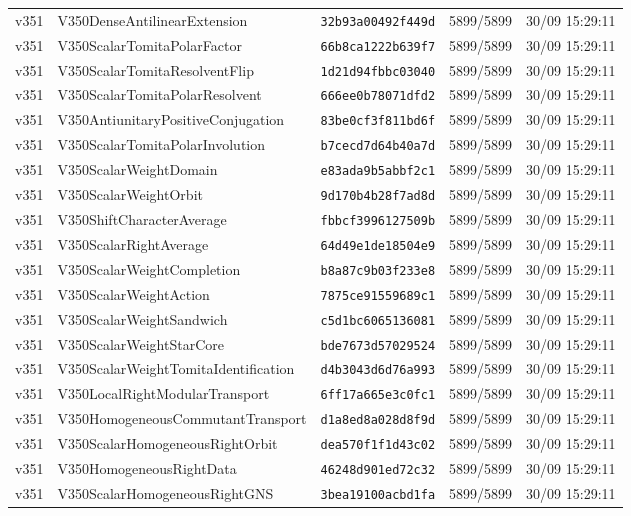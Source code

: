 \documentclass[11pt]{article}
\theoremstyle{definition}\newtheorem{deriv}{Derivation}
\begin{document}
{\begin{longtable}{@{}lllll@{}}
v351 & V350DenseAntilinearExtension & \texttt{32b93a00492f449d} & 5899/5899 & 30/09 15:29:11 \\
v351 & V350ScalarTomitaPolarFactor & \texttt{66b8ca1222b639f7} & 5899/5899 & 30/09 15:29:11 \\
v351 & V350ScalarTomitaResolventFlip & \texttt{1d21d94fbbc03040} & 5899/5899 & 30/09 15:29:11 \\
v351 & V350ScalarTomitaPolarResolvent & \texttt{666ee0b78071dfd2} & 5899/5899 & 30/09 15:29:11 \\
v351 & V350AntiunitaryPositiveConjugation & \texttt{83be0cf3f811bd6f} & 5899/5899 & 30/09 15:29:11 \\
v351 & V350ScalarTomitaPolarInvolution & \texttt{b7cecd7d64b40a7d} & 5899/5899 & 30/09 15:29:11 \\
v351 & V350ScalarWeightDomain & \texttt{e83ada9b5abbf2c1} & 5899/5899 & 30/09 15:29:11 \\
v351 & V350ScalarWeightOrbit & \texttt{9d170b4b28f7ad8d} & 5899/5899 & 30/09 15:29:11 \\
v351 & V350ShiftCharacterAverage & \texttt{fbbcf3996127509b} & 5899/5899 & 30/09 15:29:11 \\
v351 & V350ScalarRightAverage & \texttt{64d49e1de18504e9} & 5899/5899 & 30/09 15:29:11 \\
v351 & V350ScalarWeightCompletion & \texttt{b8a87c9b03f233e8} & 5899/5899 & 30/09 15:29:11 \\
v351 & V350ScalarWeightAction & \texttt{7875ce91559689c1} & 5899/5899 & 30/09 15:29:11 \\
v351 & V350ScalarWeightSandwich & \texttt{c5d1bc6065136081} & 5899/5899 & 30/09 15:29:11 \\
v351 & V350ScalarWeightStarCore & \texttt{bde7673d57029524} & 5899/5899 & 30/09 15:29:11 \\
v351 & V350ScalarWeightTomitaIdentification & \texttt{d4b3043d6d76a993} & 5899/5899 & 30/09 15:29:11 \\
v351 & V350LocalRightModularTransport & \texttt{6ff17a665e3c0fc1} & 5899/5899 & 30/09 15:29:11 \\
v351 & V350HomogeneousCommutantTransport & \texttt{d1a8ed8a028d8f9d} & 5899/5899 & 30/09 15:29:11 \\
v351 & V350ScalarHomogeneousRightOrbit & \texttt{dea570f1f1d43c02} & 5899/5899 & 30/09 15:29:11 \\
v351 & V350HomogeneousRightData & \texttt{46248d901ed72c32} & 5899/5899 & 30/09 15:29:11 \\
v351 & V350ScalarHomogeneousRightGNS & \texttt{3bea19100acbd1fa} & 5899/5899 & 30/09 15:29:11 \\

\end{longtable}}
\end{document}
